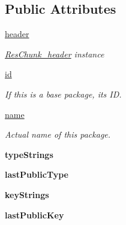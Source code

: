 \subsection*{Public Attributes}
\begin{DoxyCompactItemize}
\item 
\mbox{\hyperlink{classarsc_1_1package_1_1ResTable__package__header_ab92288c84778472ad9bd44c300913f38}{header}}
\begin{DoxyCompactList}\small\item\em \mbox{\hyperlink{}{Res\+Chunk\+\_\+header}} instance \end{DoxyCompactList}\item 
\mbox{\hyperlink{classarsc_1_1package_1_1ResTable__package__header_ae0be8e4719350496515e7b83b3e74e38}{id}}
\begin{DoxyCompactList}\small\item\em If this is a base package, its ID. \end{DoxyCompactList}\item 
\mbox{\hyperlink{classarsc_1_1package_1_1ResTable__package__header_a9862f17d7cd35b4662c5928e01d63882}{name}}
\begin{DoxyCompactList}\small\item\em Actual name of this package. \end{DoxyCompactList}\item 
\mbox{\label{classarsc_1_1package_1_1ResTable__package__header_adfa402b7e3c51d14b3d32544a812b87a}} 
{\bfseries type\+Strings}
\item 
\mbox{\label{classarsc_1_1package_1_1ResTable__package__header_a8abebe6f44cbbfc89f373f219de356af}} 
{\bfseries last\+Public\+Type}
\item 
\mbox{\label{classarsc_1_1package_1_1ResTable__package__header_a47c2f8469f57075a5e006e0192137ac4}} 
{\bfseries key\+Strings}
\item 
\mbox{\label{classarsc_1_1package_1_1ResTable__package__header_a76826f1929ede66dc7a1ffd7d4a7f6a7}} 
{\bfseries last\+Public\+Key}
\end{DoxyCompactItemize}
